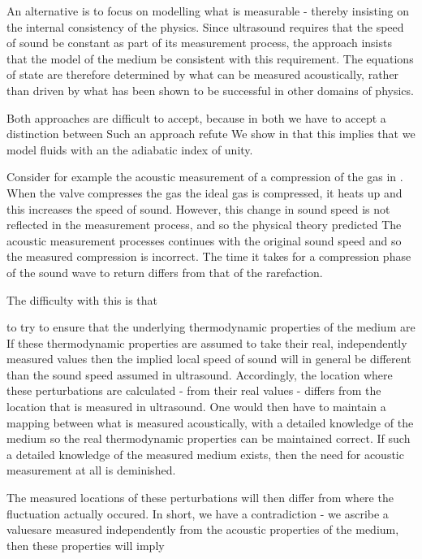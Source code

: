 
An alternative is to focus on modelling what is measurable - thereby insisting on the internal consistency of the physics.
Since ultrasound requires that the speed of sound be constant as part of its measurement process, 
the approach insists that the  model of the medium be consistent with this requirement.
The equations of state are therefore determined by what can be measured acoustically, 
rather than driven by what has been shown to be successful in other domains of physics.

Both approaches are difficult to accept, 
because in both we have to accept a distinction between 
Such an approach refute 
We show in  that this implies that we model fluids with an the adiabatic index of unity.



Consider for example the acoustic measurement of a compression of the gas in .
When the valve compresses the gas the  ideal gas is compressed, it heats up and this increases the speed of sound. 
However, this change in sound speed is not reflected in the measurement process, and so the physical theory predicted 
The acoustic measurement processes continues with the original sound speed and so the measured compression is incorrect.  
The time it takes for a compression phase of the sound wave to return differs from that of the rarefaction.  


The difficulty with this is that 

 to try to ensure that the underlying thermodynamic properties of the medium are
If these thermodynamic properties are assumed to take their real, independently measured values then the implied local speed of sound will in general be different than the sound speed assumed in ultrasound.  
Accordingly, the location where these perturbations are calculated - from their real values - differs from the location that is measured in ultrasound.  
One would then have to maintain a mapping between what is measured acoustically, with a detailed knowledge of the medium so the real thermodynamic properties can be maintained correct.
If such a detailed knowledge of the measured medium exists, then the need for acoustic measurement at all is deminished.




The measured locations of these perturbations will then differ from where the fluctuation actually occured.  In short, we have a contradiction - we ascribe a   valuesare measured independently from the acoustic properties of the medium, 
then these properties will imply 



